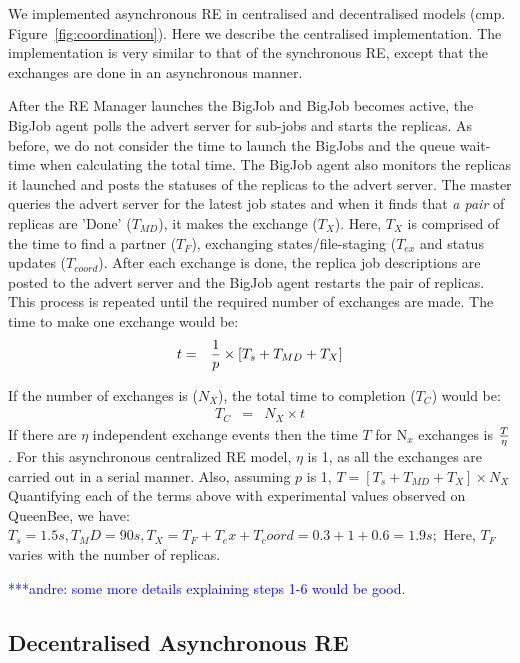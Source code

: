 \documentclass{rspublic}
\newcommand{\alnote}[1]{ {\textcolor{blue} { ***andre: #1 }}}
\newcommand{\alnote}[1]{}
\begin{document}
We implemented asynchronous RE in centralised and decentralised models 
(cmp. Figure~\ref{fig:coordination}). Here we describe the centralised 
implementation. The implementation is very similar to that of the 
synchronous RE, except that the exchanges are done in an asynchronous manner. 

After the RE Manager launches the BigJob and BigJob becomes active, the BigJob agent polls the advert server for sub-jobs and starts the replicas. As before, we do not consider the time to launch the BigJobs and the queue wait-time when calculating the total time.  The BigJob agent also monitors the 
replicas it launched and posts the statuses of the replicas to the advert 
server. The master queries the advert server for the latest job 
states and when it finds that \emph{a pair} of replicas are 'Done' ($T_{MD}$), it 
makes the exchange ($T_{X}$). Here, $T_{X}$ is comprised of the time to find a partner ($T_{F}$), exchanging states/file-staging ($T_{ex}$ and status updates ($T_{coord}$). 
After each exchange is done, the replica job descriptions 
are posted to the advert server and the BigJob agent restarts the pair of
replicas. This process is repeated until the required number of 
exchanges are made. The time to make one exchange would be:
\begin{eqnarray}
t &=&  {1 \over p} \times {[T_s+T_{MD} + T_{X}]} 
\label{eq:cent}
\end{eqnarray}

If the number of exchanges is ($N_{X}$), the total time to completion ($T_{C}$) would be:
\begin{eqnarray}
T_{C} &=& N_{X} \times t 
\label{eq:centr}
\end{eqnarray}
If there are $\eta$ independent exchange events then the time $T$ for 
N$_x$ exchanges is $T \over \eta$. For this asynchronous centralized RE model, $\eta$ is 1, as all the exchanges are carried out in a serial manner. Also, assuming $p$ is 1, $T =  [T_s+T_{MD} + T_{X} ] \times N_{X}$
Quantifying each of the terms above with experimental values observed on QueenBee, we have:
$T_s = 1.5 s, T_MD=90 s, T_X=T_F+T_ex+T_coord=0.3+1+0.6=1.9 s; $ 
Here, $T_F$ varies with the number of replicas.

 \alnote{some more details explaining steps 1-6 would be good.}%

\subsection{Decentralised Asynchronous RE}
\end{document}
